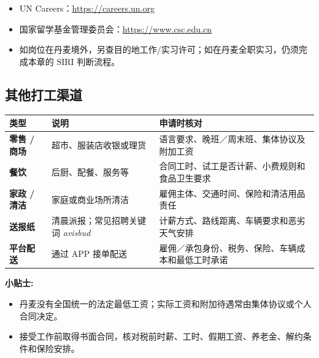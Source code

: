 \begin{itemize}[leftmargin=2em,itemsep=2pt]
  \item UN Careers：\url{https://careers.un.org}
  \item 国家留学基金管理委员会：\url{https://www.csc.edu.cn}
  \item 如岗位在丹麦境外，另查目的地工作/实习许可；如在丹麦全职实习，仍须完成本章的 SIRI 判断流程。
\end{itemize}


\subsection{其他打工渠道}

\begin{table}[ht]
  \scriptsize
  \centering
  \renewcommand{\arraystretch}{1.2}
  \setlength{\tabcolsep}{5pt}
  \label{tab:parttime_wage}
  \begin{tabularx}{\textwidth}{p{} X X}
    \toprule
    \textbf{类型} & \textbf{说明} & \textbf{申请时核对} \\
    \midrule

    \textbf{零售 / 商场} & 超市、服装店收银或理货 & 语言要求、晚班／周末班、集体协议及附加工资 \\
    \textbf{餐饮} & 后厨、配餐、服务等 & 合同工时、试工是否计薪、小费规则和食品卫生要求 \\
    \textbf{家政 / 清洁} & 家庭或商业场所清洁 & 雇佣主体、交通时间、保险和清洁用品责任 \\
    \textbf{送报纸} & 清晨派报；常见招聘关键词 \textit{avisbud} & 计薪方式、路线距离、车辆要求和恶劣天气安排 \\
    \textbf{平台配送} & 通过 APP 接单配送 & 雇佣／承包身份、税务、保险、车辆成本和最低工时承诺 \\
    \bottomrule
  \end{tabularx}
\end{table}

\begin{grayleftbox}\textbf{小贴士: }
\begin{itemize}
  \item 丹麦没有全国统一的法定最低工资；实际工资和附加待遇常由集体协议或个人合同决定。
  \item 接受工作前取得书面合同，核对税前时薪、工时、假期工资、养老金、解约条件和保险安排。
\end{itemize}
\end{grayleftbox}



